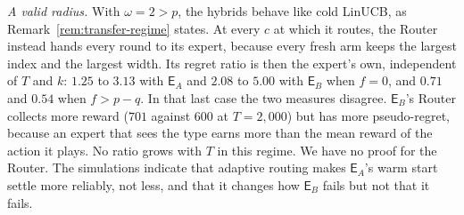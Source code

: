 \documentclass[anon]{alt2027} %
\newcommand{\Exp}{\mathsf{E}}
\begin{document}
\emph{A valid radius.} With $\omega=2>p$, the hybrids behave like cold LinUCB, as
Remark~\ref{rem:transfer-regime} states. At every $c$ at which it routes, the Router instead hands every round
to its expert, because every fresh arm keeps the largest index and the largest
width. Its regret ratio is then the expert's own, independent of $T$ and $k$:
$1.25$ to $3.13$ with $\Exp_A$ and $2.08$ to $5.00$ with $\Exp_B$ when $f=0$, and
$0.71$ and $0.54$ when $f>p-q$. In that last case the two measures disagree.
$\Exp_B$'s Router collects more reward ($701$ against $600$ at $T=2{,}000$) but
has more pseudo-regret, because an expert that sees the type earns more than
the mean reward of the action it plays. No ratio grows with $T$ in this regime.
We have no proof for the Router. The simulations indicate that adaptive
routing makes $\Exp_A$'s warm start settle more reliably, not less, and that
it changes how $\Exp_B$ fails but not that it fails.
\end{document}
